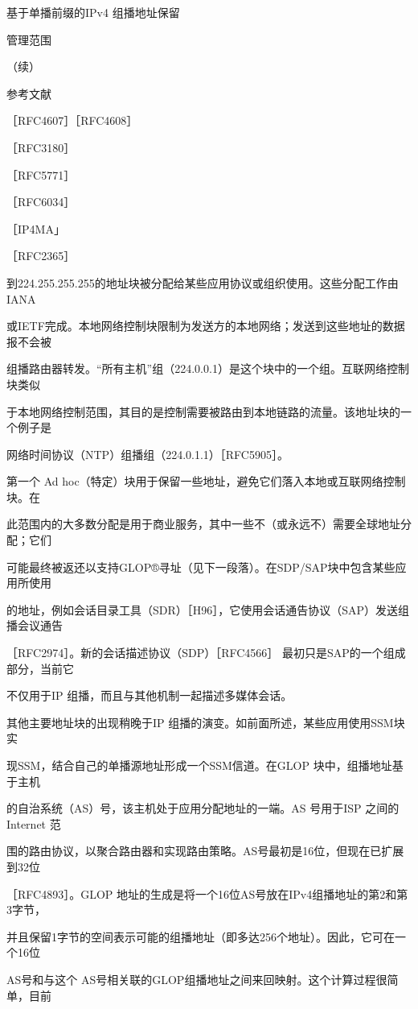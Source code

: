 基于单播前缀的IPv4 组播地址保留

管理范围

（续）

参考文献

［RFC4607］［RFC4608］

［RFC3180］

［RFC5771］

［RFC6034］

［IP4MA」

［RFC2365］

到224.255.255.255的地址块被分配给某些应用协议或组织使用。这些分配工作由IANA

或IETF完成。本地网络控制块限制为发送方的本地网络；发送到这些地址的数据报不会被

组播路由器转发。“所有主机”组（224.0.0.1）是这个块中的一个组。互联网络控制块类似

于本地网络控制范围，其目的是控制需要被路由到本地链路的流量。该地址块的一个例子是

网络时间协议（NTP）组播组（224.0.1.1）［RFC5905］。

第一个 Ad hoc（特定）块用于保留一些地址，避免它们落入本地或互联网络控制块。在

此范围内的大多数分配是用于商业服务，其中一些不（或永远不）需要全球地址分配；它们

可能最终被返还以支持GLOP®寻址（见下一段落）。在SDP/SAP块中包含某些应用所使用

的地址，例如会话目录工具（SDR）［H96］，它使用会话通告协议（SAP）发送组播会议通告

［RFC2974］。新的会话描述协议（SDP）［RFC4566］ 最初只是SAP的一个组成部分，当前它

不仅用于IP 组播，而且与其他机制一起描述多媒体会话。

其他主要地址块的出现稍晚于IP 组播的演变。如前面所述，某些应用使用SSM块实

现SSM，结合自己的单播源地址形成一个SSM信道。在GLOP 块中，组播地址基于主机

的自治系统（AS）号，该主机处于应用分配地址的一端。AS 号用于ISP 之间的 Internet 范

围的路由协议，以聚合路由器和实现路由策略。AS号最初是16位，但现在已扩展到32位

［RFC4893］。GLOP 地址的生成是将一个16位AS号放在IPv4组播地址的第2和第3字节，

并且保留1字节的空间表示可能的组播地址（即多达256个地址）。因此，它可在一个16位

AS号和与这个 AS号相关联的GLOP组播地址之间来回映射。这个计算过程很简单，目前

